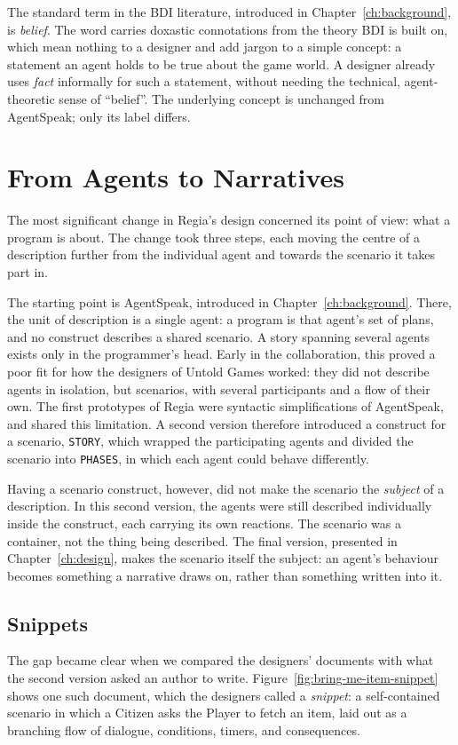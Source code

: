 The standard term in the BDI literature, introduced in Chapter~\ref{ch:background}, is \emph{belief}. The word carries doxastic connotations from the theory BDI is built on, which mean nothing to a designer and add jargon to a simple concept: a statement an agent holds to be true about the game world. A designer already uses \emph{fact} informally for such a statement, without needing the technical, agent-theoretic sense of ``belief''. The underlying concept is unchanged from AgentSpeak; only its label differs.

\section{From Agents to Narratives}
\label{sec:agents-to-narratives}
The most significant change in Regia's design concerned its point of view: what a program is about. The change took three steps, each moving the centre of a description further from the individual agent and towards the scenario it takes part in.
 
The starting point is AgentSpeak, introduced in Chapter~\ref{ch:background}. There, the unit of description is a single agent: a program is that agent's set of plans, and no construct describes a shared scenario. A story spanning several agents exists only in the programmer's head. Early in the collaboration, this proved a poor fit for how the designers of Untold Games worked: they did not describe agents in isolation, but scenarios, with several participants and a flow of their own. The first prototypes of Regia were syntactic simplifications of AgentSpeak, and shared this limitation. A second version therefore introduced a construct for a scenario, \lstinline|STORY|, which wrapped the participating agents and divided the scenario into \lstinline|PHASES|, in which each agent could behave differently.
 
Having a scenario construct, however, did not make the scenario the \emph{subject} of a description. In this second version, the agents were still described individually inside the construct, each carrying its own reactions. The scenario was a container, not the thing being described. The final version, presented in Chapter~\ref{ch:design}, makes the scenario itself the subject: an agent's behaviour becomes something a narrative draws on, rather than something written into it.
 
\subsection{Snippets}
The gap became clear when we compared the designers' documents with what the second version asked an author to write. Figure~\ref{fig:bring-me-item-snippet} shows one such document, which the designers called a \emph{snippet}: a self-contained scenario in which a Citizen asks the Player to fetch an item, laid out as a branching flow of dialogue, conditions, timers, and consequences.
 
